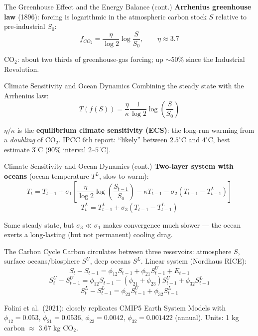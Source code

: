\documentclass[blue]{beamer}
\begin{document}
\begin{frame}{The Greenhouse Effect and the Energy Balance (cont.)}
\bigskip
\textbf{Arrhenius greenhouse law} (1896): forcing is logarithmic in the atmospheric carbon stock $S$ relative to pre-industrial $S_0$:
\[
f_{CO_2} = \frac{\eta}{\log 2}\log\frac{S}{S_0}, \qquad \eta \approx 3.7
\]

CO$_2$: about two thirds of greenhouse-gas forcing; up $\sim$50\% since the Industrial Revolution.
\end{frame}

\begin{frame}{Climate Sensitivity and Ocean Dynamics}
Combining the steady state with the Arrhenius law:
\[
T(f(S)) = \frac{\eta}{\kappa}\frac{1}{\log 2}\log\left(\frac{S}{S_0}\right)
\]

$\eta/\kappa$ is the \textbf{equilibrium climate sensitivity (ECS)}: the long-run warming from a \emph{doubling} of CO$_2$. IPCC 6th report: ``likely'' between $2.5^{\circ}$C and $4^{\circ}$C, best estimate $3^{\circ}$C (90\% interval $2$--$5^{\circ}$C).

\end{frame}

\begin{frame}{Climate Sensitivity and Ocean Dynamics (cont.)}
\bigskip
\textbf{Two-layer system with oceans} (ocean temperature $T^L$, slow to warm):
\[
T_t = T_{t-1} + \sigma_1\left[\frac{\eta}{\log 2}\log\left(\frac{S_{t-1}}{S_0}\right) - \kappa T_{t-1} - \sigma_2\left(T_{t-1} - T^L_{t-1}\right)\right]
\]
\[
T^L_t = T^L_{t-1} + \sigma_3\left(T_{t-1} - T^L_{t-1}\right)
\]

Same steady state, but $\sigma_3 \ll \sigma_1$ makes convergence much slower --- the ocean exerts a long-lasting (but not permanent) cooling drag.
\end{frame}

\begin{frame}{The Carbon Cycle}
Carbon circulates between three reservoirs: atmosphere $S$, surface oceans/biosphere $S^U$, deep oceans $S^L$. Linear system (Nordhaus RICE):
\[
S_t - S_{t-1} = \phi_{12}S_{t-1} + \phi_{21}S^U_{t-1} + E_{t-1}
\]
\[
S^U_t - S^U_{t-1} = \phi_{12}S_{t-1} - (\phi_{21} + \phi_{23})S^U_{t-1} + \phi_{32}S^L_{t-1}
\]
\[
S^L_t - S^L_{t-1} = \phi_{23}S^U_{t-1} + \phi_{32}S^L_{t-1}
\]

Folini et al.\ (2021): closely replicates CMIP5 Earth System Models with $\phi_{12} = 0.053$, $\phi_{21} = 0.0536$, $\phi_{23} = 0.0042$, $\phi_{32} = 0.001422$ (annual). Units: 1 kg carbon $\approx$ 3.67 kg CO$_2$.

\end{frame}
\end{document}
